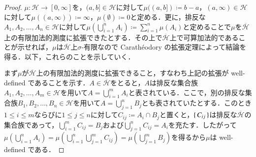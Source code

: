 \begin{proof}
$\mu \colon \mathcal{H} \to [0,\infty]$を，$(a,b] \in \mathcal{H}$に対して$\mu((a,b]) \coloneqq b-a$，$(a,\infty) \in \mathcal{H}$に対して$\mu((a,\infty)) \coloneqq \infty$，$\mu(\emptyset) \coloneqq 0$と定める．更に，排反な$A_1, A_2, \dots, A_n \in \mathcal{H}$に対して$\mu\left(\bigcup_{i=1}^n A_i\right) \coloneqq \sum_{i=1}^n \mu(A_i)$と定めることで$\mu$を$\overline{\mathcal{H}}$上の有限加法的測度に拡張できたとする．その上で$\overline{\mathcal{H}}$上で可算加法的であることが示せれば，$\mu$は$\overline{\mathcal{H}}$上$\sigma$-有限なので Carath\'eodory の拡張定理によって結論を得る．以下，これらのことを示していく．

まず$\mu$が$\overline{\mathcal{H}}$上の有限加法的測度に拡張できること，すなわち上記の拡張が well-defined であることを示す．$A \in \overline{\mathcal{H}}$をとると，$A$は排反な集合族$A_1, A_2, \dots, A_m \in \mathcal{H}$を用いて$A = \bigcup_{i=1}^m A_i$と表されている．ここで，別の排反な集合族$B_1, B_2, \dots, B_n \in \mathcal{H}$を用いて$A = \bigcup_{j=1}^n B_j$とも表されていたとする．このとき$1 \leq i \leq m$ならびに$1 \leq j \leq n$に対して$C_{ij} \coloneqq A_i \cap B_j$と置くと，$\set{C_{ij}}$は排反な$\overline{\mathcal{H}}$の集合族であって，$\bigcup_{i=1}^m C_{ij} = B_j$および$\bigcup_{j=1}^n C_{ij} = A_i$を充たす．したがって$\mu\left( \bigcup_{i=1}^n A_i \right) = \mu\left( \bigcup_{i=1}^n \bigcup_{j=1}^m C_{ij} \right) = \mu\left( \bigcup_{j=1}^m B_j \right)$を得るから$\mu$は well-defined である．


\end{proof}

